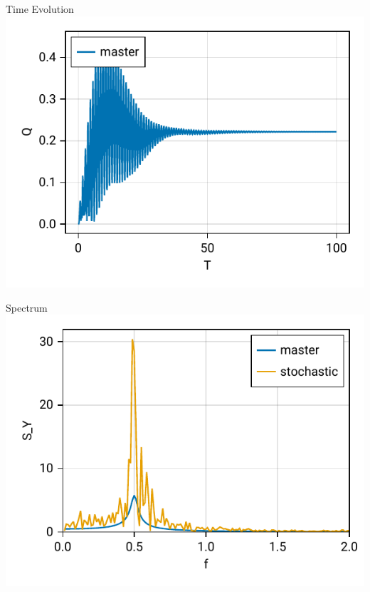 \begin{frame}{Time Evolution}
	\centering
	\includegraphics{figures/01 time evolution.pdf}
\end{frame}

\begin{frame}{Spectrum}
	\centering
	\includegraphics{figures/01 time evolution spectrum.pdf}
\end{frame}


